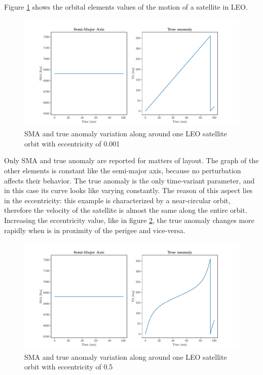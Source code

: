 \begin{itemize}
Figure \ref{kep_low_ecc_fig} shows the orbital elements values of the motion of a satellite in LEO.
\begin{figure}[h]
      \centering
      \includegraphics[scale=0.5]{img/keplerian_elements_low_ecc.pdf}
      \caption{SMA and true anomaly variation along around one LEO satellite orbit with eccentricity of 0.001}
      \label{kep_low_ecc_fig}
\end{figure}
Only SMA and true anomaly are reported for matters of layout.
The graph of the other elements is constant like the semi-major axis, because no perturbation affects their behavior.
The true anomaly is the only time-variant parameter, and in this case its curve looks like varying constantly.
The reason of this aspect lies in the eccentricity: this example is characterized by a near-circular orbit, therefore the velocity of the satellite is almost the same along the entire orbit.
Increasing the eccentricity value, like in figure \ref{kep_high_ecc_fig}, the true anomaly changes more rapidly when is in proximity of the perigee and vice-versa.
\begin{figure}[h]
      \centering
      \includegraphics[scale=0.5]{img/keplerian_elements_high_ecc.pdf}
      \caption{SMA and true anomaly variation along around one LEO satellite orbit with eccentricity of 0.5}
      \label{kep_high_ecc_fig}
\end{figure}


\end{itemize}
